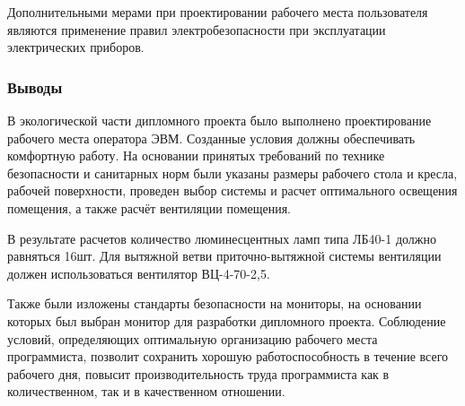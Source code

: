 Дополнительными мерами при проектировании рабочего места пользователя являются применение правил электробезопасности при эксплуатации электрических приборов.

\subsubsection{Выводы}
В экологической части дипломного проекта было выполнено проектирование рабочего места оператора ЭВМ. Созданные условия должны обеспечивать комфортную работу. На основании принятых требований по технике безопасности и санитарных норм были указаны размеры рабочего стола и кресла, рабочей поверхности, проведен выбор системы и расчет оптимального освещения помещения, а также расчёт вентиляции помещения.

В результате расчетов количество люминесцентных ламп типа ЛБ40-1 должно равняться 16шт. Для вытяжной ветви приточно-вытяжной системы вентиляции должен использоваться вентилятор ВЦ-4-70-2,5.

Также были изложены стандарты безопасности на мониторы, на основании которых был выбран монитор для разработки дипломного проекта. Соблюдение условий, определяющих оптимальную организацию рабочего места программиста, позволит сохранить хорошую работоспособность в течение всего рабочего дня, повысит производительность труда программиста как в количественном, так и в качественном отношении.
